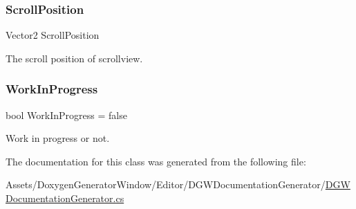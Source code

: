 \subsubsection{\texorpdfstring{Scroll\+Position}{ScrollPosition}}
{\footnotesize\ttfamily Vector2 Scroll\+Position\hspace{0.3cm}{\ttfamily [private]}}



The scroll position of scrollview. 

\mbox{\label{classDoxygenGeneratorWindow_1_1DGWDocumentationGenerator_a081bcc409dad2dc380fa85c9e1c3235d}} 
\subsubsection{\texorpdfstring{Work\+In\+Progress}{WorkInProgress}}
{\footnotesize\ttfamily bool Work\+In\+Progress = false}



Work in progress or not. 



The documentation for this class was generated from the following file\+:\begin{DoxyCompactItemize}
\item 
Assets/\+Doxygen\+Generator\+Window/\+Editor/\+D\+G\+W\+Documentation\+Generator/\hyperlink{DGWDocumentationGenerator_8cs}{D\+G\+W\+Documentation\+Generator.\+cs}\end{DoxyCompactItemize}
